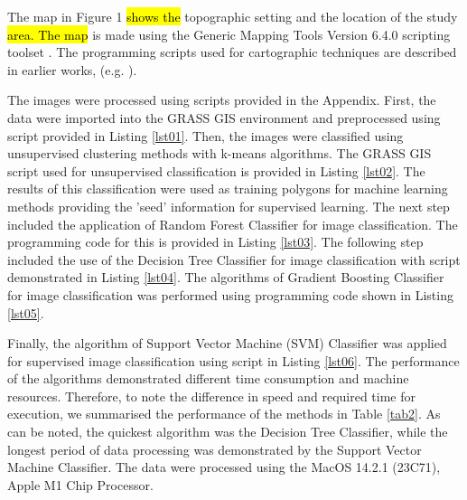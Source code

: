\documentclass[12pt,a4paper,oneside]{article}
\def \newpar{\vspace{6pt}}
\begin{document}
\newpar The map in Figure 1 \hl{shows the }topographic setting and the location of the study \hl{area. The map }is made using the Generic Mapping Tools Version 6.4.0 scripting toolset \citep{Wessel}. The programming scripts used for cartographic techniques are described in earlier works, (e.g. \citep{Lemenkova202203,Lemenkova202216,Lemenkova202212}).

\newpar The images were processed using scripts provided in the Appendix. First, the data were imported into the GRASS GIS environment and preprocessed using script provided in Listing \ref{lst01}. Then, the images were classified using unsupervised clustering methods with k-means algorithms. The GRASS GIS script used for   unsupervised classification is provided in Listing \ref{lst02}. The results of this classification were used as training polygons for machine learning methods providing the 'seed' information for supervised learning. The next step included the application of Random Forest Classifier for image classification. The programming code for this is provided in Listing \ref{lst03}. The following step included the use of the Decision Tree Classifier for image classification with script demonstrated in Listing \ref{lst04}. The algorithms of Gradient Boosting Classifier for image classification was performed using programming code shown in Listing \ref{lst05}. 

\newpar Finally, the algorithm of Support Vector Machine (SVM) Classifier was applied for supervised image classification using script in Listing \ref{lst06}. The performance of the algorithms demonstrated different time consumption and machine resources. Therefore, to note the difference in speed and required time for execution, we summarised the performance of the methods in Table \ref{tab2}. As can be noted, the quickest algorithm was the Decision Tree Classifier, while the longest period of data processing was demonstrated by the Support Vector Machine Classifier. The data were processed using the MacOS 14.2.1 (23C71), Apple M1 Chip Processor. 
\end{document}

